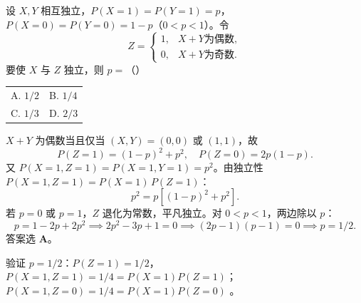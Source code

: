 \documentclass[lang=cn,11pt]{elegantbook}
\begin{document}
\begin{exercise}[独立性条件求参数] \label{exer:3-d2}
设 $X,Y$ 相互独立，$P(X=1)=P(Y=1)=p$，$P(X=0)=P(Y=0)=1-p$（$0<p<1$）。令
\[
Z = \begin{cases} 1, & X+Y \text{为偶数}, \\ 0, & X+Y \text{为奇数}. \end{cases}
\]
要使 $X$ 与 $Z$ 独立，则 $p = $（\quad）
\begin{tabular}{ll}
A. $1/2$ & B. $1/4$ \\
C. $1/3$ & D. $2/3$
\end{tabular}
\end{exercise}
\begin{solution}
$X+Y$ 为偶数当且仅当 $(X,Y) = (0,0)$ 或 $(1,1)$，故
\[
P(Z=1) = (1-p)^2+p^2,\quad P(Z=0) = 2p(1-p).
\]
又 $P(X=1,Z=1) = P(X=1,Y=1) = p^2$。由独立性 $P(X=1,Z=1) = P(X=1)\,P(Z=1)$：
\[
p^2 = p\left[(1-p)^2+p^2\right].
\]
若 $p=0$ 或 $p=1$，$Z$ 退化为常数，平凡独立。对 $0<p<1$，两边除以 $p$：
\[
p = 1-2p+2p^2 \implies 2p^2-3p+1 = 0 \implies (2p-1)(p-1) = 0 \implies p = 1/2.
\]
答案选 \textbf{A}。
\begin{note}
验证 $p=1/2$：$P(Z=1)=1/2$，$P(X=1,Z=1)=1/4=P(X=1)P(Z=1)$；$P(X=1,Z=0)=1/4=P(X=1)P(Z=0)$ 。
\end{note}
\end{solution}
\end{document}
